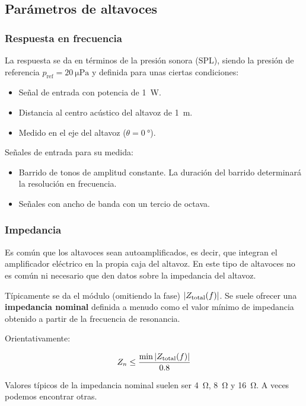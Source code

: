\documentclass[12pt, a4paper]{article}
\begin{document}
\subsection{Parámetros de altavoces}
\subsubsection{Respuesta en frecuencia}

La respuesta se da en términos de la presión sonora (SPL), siendo la presión de referencia $p _{\text{ref}} = \qty{20}{\micro\pascal}$ y definida para unas ciertas condiciones:
\begin{itemize}
    \item Señal de entrada con potencia de \qty{1}{\watt}.
    \item Distancia al centro acústico del altavoz de \qty{1}{\meter}.
    \item Medido en el eje del altavoz ($\theta = \qty{0}{\degree}$).
\end{itemize}

Señales de entrada para su medida:
\begin{itemize}
    \item Barrido de tonos de amplitud constante. La duración del barrido determinará la resolución en frecuencia.
    \item Señales con ancho de banda con un tercio de octava.
\end{itemize}

\subsubsection{Impedancia}

Es común que los altavoces sean autoamplificados, es decir, que integran el amplificador eléctrico en la propia caja del altavoz. En este tipo de altavoces no es común ni necesario que den datos sobre la impedancia del altavoz.

Típicamente se da el módulo (omitiendo la fase) $\abs{Z _{\text{total}}(f)}$. Se suele ofrecer una \textbf{impedancia nominal} definida a menudo como el valor mínimo de impedancia obtenido a partir de la frecuencia de resonancia.

Orientativamente:

\begin{equation} \label{eq:impedancia_nominal}
    Z _n \leq \frac{\min \abs{ Z _{\text{total}}(f)} }{0.8}
\end{equation}

Valores típicos de la impedancia nominal suelen ser \qty{4}{\ohm}, \qty{8}{\ohm} y \qty{16}{\ohm}. A veces podemos encontrar otras.
\end{document}
